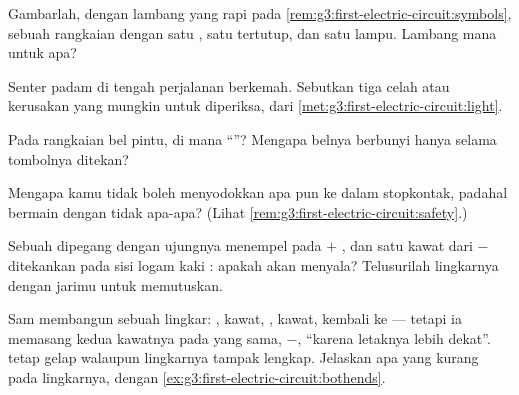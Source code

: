 \begin{exercise}[$\star$]\label{exo:g3:first-electric-circuit:5}
Gambarlah, dengan lambang yang rapi pada
\cref{rem:g3:first-electric-circuit:symbols}, sebuah rangkaian dengan
satu , satu  tertutup, dan satu lampu. Lambang mana
untuk apa?
\end{exercise}

\begin{exercise}[$\star$]\label{exo:g3:first-electric-circuit:6}
Senter padam di tengah perjalanan berkemah. Sebutkan tiga celah atau
kerusakan yang mungkin untuk diperiksa, dari
\cref{met:g3:first-electric-circuit:light}.
\end{exercise}

\begin{exercise}[$\star$]\label{exo:g3:first-electric-circuit:7}
Pada rangkaian bel pintu, di mana ``''? Mengapa belnya
berbunyi hanya selama tombolnya ditekan?
\end{exercise}

\begin{exercise}[$\star$]\label{exo:g3:first-electric-circuit:8}
Mengapa kamu tidak boleh menyodokkan apa pun ke dalam stopkontak,
padahal bermain dengan  tidak apa-apa? (Lihat
\cref{rem:g3:first-electric-circuit:safety}.)
\end{exercise}

\begin{exercise}[$\star$]\label{exo:g3:first-electric-circuit:9}
Sebuah  dipegang dengan ujungnya menempel pada  $+$
, dan satu kawat dari  $-$  ditekankan pada sisi
logam kaki : apakah  akan menyala? Telusurilah
lingkarnya dengan jarimu untuk memutuskan.
\end{exercise}

\begin{exercise}[$\star\star$]\label{exo:g3:first-electric-circuit:10}
Sam membangun sebuah lingkar: , kawat, , kawat, kembali
ke  --- tetapi ia memasang kedua kawatnya pada  yang sama,
$-$, ``karena letaknya lebih dekat''.  tetap gelap walaupun
lingkarnya tampak lengkap. Jelaskan apa yang kurang pada lingkarnya,
dengan \cref{ex:g3:first-electric-circuit:bothends}.
\end{exercise}

